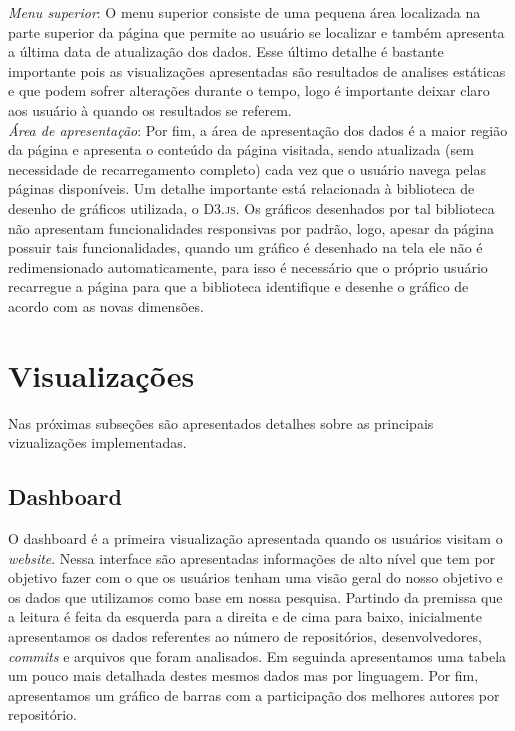 \documentclass[12pt]{article}
\begin{document}
\noindent \emph{Menu superior}: O menu superior consiste de uma pequena área localizada na parte superior da página que permite ao usuário se localizar e também apresenta a última data de atualização dos dados. Esse último detalhe é bastante importante pois as visualizações apresentadas são resultados de analises estáticas e que podem sofrer alterações durante o tempo, logo é importante deixar claro aos usuário à quando os resultados se referem. \\

\noindent \emph{Área de apresentação}: Por fim, a área de apresentação dos dados é a maior região da página e apresenta o conteúdo da página visitada, sendo atualizada (sem necessidade de recarregamento completo) cada vez que o usuário navega pelas páginas disponíveis. Um detalhe importante está relacionada à biblioteca de desenho de gráficos utilizada, o \textsc{D3.js}. Os gráficos desenhados por tal biblioteca não apresentam funcionalidades responsivas por padrão, logo, apesar da página possuir tais funcionalidades, quando um gráfico é desenhado na tela ele não é redimensionado automaticamente, para isso é necessário que o próprio usuário recarregue a página para que a biblioteca identifique e desenhe o gráfico de acordo com as novas dimensões. \\

\section{Visualizações}

Nas próximas subseções são apresentados detalhes sobre as principais vizualizações implementadas.

\subsection{Dashboard}

O dashboard é a primeira visualização apresentada quando os usuários visitam o \textit{website}. Nessa interface são apresentadas informações de alto nível que tem por objetivo fazer com o que os usuários tenham uma visão geral do nosso objetivo e os dados que utilizamos como base em nossa pesquisa. Partindo da premissa que a leitura é feita da esquerda para a direita e de cima para baixo, inicialmente apresentamos os dados referentes ao número de repositórios, desenvolvedores, \textit{commits} e arquivos que foram analisados. Em seguinda apresentamos uma tabela um pouco mais detalhada destes mesmos dados mas por linguagem. Por fim, apresentamos um gráfico de barras com a participação dos melhores autores por repositório.
\end{document}
